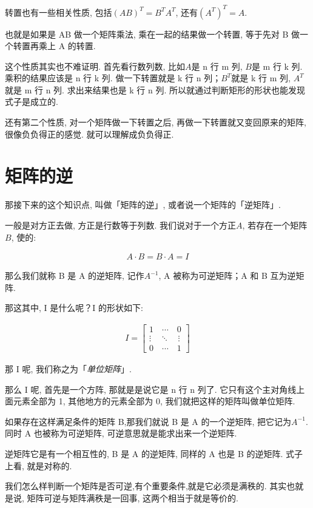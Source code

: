 转置也有一些相关性质, 包括$(AB)^T = B^TA^T$, 还有$(A^T)^T = A$. 

也就是如果是 AB 做一个矩阵乘法, 乘在一起的结果做一个转置, 等于先对 B 做一个转置再乘上 A 的转置. 

这个性质其实也不难证明. 首先看行数列数, 比如$A$是 n 行 m 列, $B$是 m 行 k 列. 乘积的结果应该是 n 行 k 列. 做一下转置就是 k 行 n 列；$B^T$就是 k 行 m 列, $A^T$就是 m 行 n 列. 求出来结果也是 k 行 n 列. 所以就通过判断矩形的形状也能发现式子是成立的. 

还有第二个性质, 对一个矩阵做一下转置之后, 再做一下转置就又变回原来的矩阵, 很像负负得正的感觉. 就可以理解成负负得正. 

\section{矩阵的逆}

那接下来的这个知识点, 叫做「矩阵的逆」, 或者说一个矩阵的「逆矩阵」. 

一般是对方正去做, 方正是行数等于列数. 我们说对于一个方正$A$, 若存在一个矩阵$B$, 使的:

\begin{align*}
  A \cdot B = B \cdot A = I
\end{align*}

那么我们就称 B 是 A 的逆矩阵, 记作$A^{-1}$,  A 被称为可逆矩阵；A 和 B 互为逆矩阵. 

那这其中, I 是什么呢？I 的形状如下: 

\begin{align*}
I = \begin{bmatrix} 1 \quad \cdots \quad 0 \\ \vdots \quad \ddots \quad \vdots \\ 0 \quad \cdots \quad 1 \end{bmatrix}
\end{align*}

那 I 呢, 我们称之为「\textit{单位矩阵}」. 

那么 I 呢, 首先是一个方阵, 那就是是说它是 n 行 n 列了. 它只有这个主对角线上面元素全部为 1, 其他地方的元素全部为 0, 我们就把这样的矩阵叫做单位矩阵. 

如果存在这样满足条件的矩阵 B,那我们就说 B 是 A 的一个逆矩阵, 把它记为$A^{-1}$. 同时 A 也被称为可逆矩阵, 可逆意思就是能求出来一个逆矩阵. 

逆矩阵它是有一个相互性的, B 是 A 的逆矩阵, 同样的 A 也是 B 的逆矩阵. 式子上看, 就是对称的.

我们怎么样判断一个矩阵是否可逆,有个重要条件,就是它必须是满秩的. 其实也就是说, 矩阵可逆与矩阵满秩是一回事, 这两个相当于就是等价的. 

